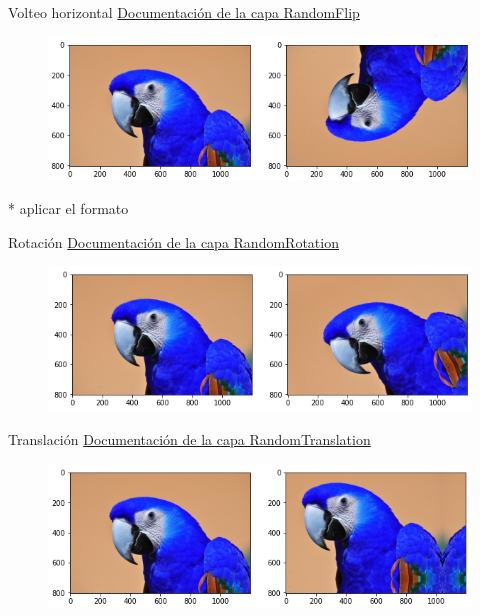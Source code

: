 \begin{frame}{Volteo horizontal}
\textcolor{blue}{\href{https://keras.io/api/layers/preprocessing_layers/image_augmentation/random_flip/}{Documentación de la capa RandomFlip}}
\begin{figure}
    \centering
    \includegraphics[width=\textwidth]{figures/Tema 3/VerFlip.png}
\end{figure}

* aplicar el formato 
\end{frame}

\begin{frame}{Rotación}
\textcolor{blue}{\href{https://keras.io/api/layers/preprocessing_layers/image_augmentation/random_rotation/}{Documentación de la capa RandomRotation}}
\begin{figure}
    \centering
    \includegraphics[width=\textwidth]{figures/Tema 3/Rotation.png}
\end{figure}
\end{frame}

\begin{frame}{Translación}
\textcolor{blue}{\href{https://keras.io/api/layers/preprocessing_layers/image_augmentation/random_translation/}{Documentación de la capa RandomTranslation}}
\begin{figure}
    \centering
    \includegraphics[width=\textwidth]{figures/Tema 3/Translation.png}
\end{figure}
\end{frame}

